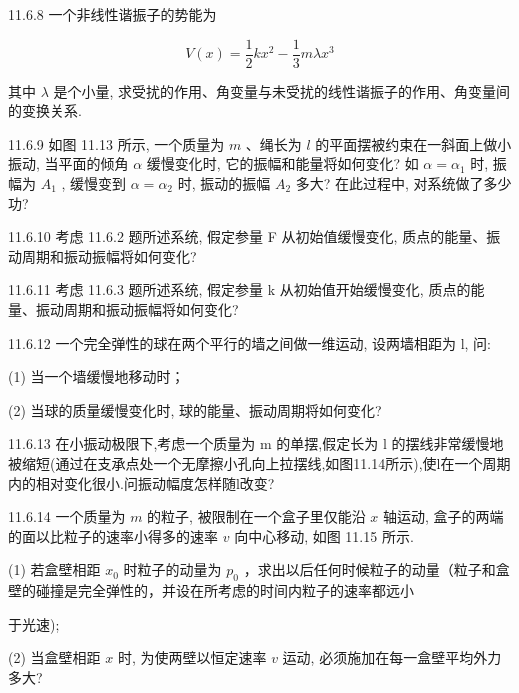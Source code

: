 \begin{problem}{11.6.8}
一个非线性谐振子的势能为

\[
V (x) = \frac {1}{2} k x ^ {2} - \frac {1}{3} m \lambda x ^ {3}
\]

其中 $\lambda$ 是个小量, 求受扰的作用、角变量与未受扰的线性谐振子的作用、角变量间的变换关系.
\end{problem}
\clearpage


\begin{problem}{11.6.9}
如图 11.13 所示, 一个质量为 $m$ 、绳长为 $l$ 的平面摆被约束在一斜面上做小振动, 当平面的倾角 $\alpha$ 缓慢变化时, 它的振幅和能量将如何变化? 如 $\alpha = \alpha_{1}$ 时, 振幅为 $A_{1}$ , 缓慢变到 $\alpha = \alpha_{2}$ 时, 振动的振幅 $A_{2}$ 多大? 在此过程中, 对系统做了多少功?
\begin{center}

\end{center}
\end{problem}
\clearpage


\begin{problem}{11.6.10}
考虑 11.6.2 题所述系统, 假定参量 F 从初始值缓慢变化, 质点的能量、振动周期和振动振幅将如何变化?
\end{problem}
\clearpage


\begin{problem}{11.6.11}
考虑 11.6.3 题所述系统, 假定参量 k 从初始值开始缓慢变化, 质点的能量、振动周期和振动振幅将如何变化?
\end{problem}
\clearpage


\begin{problem}{11.6.12}
一个完全弹性的球在两个平行的墙之间做一维运动, 设两墙相距为 l, 问:

(1) 当一个墙缓慢地移动时；

(2) 当球的质量缓慢变化时, 球的能量、振动周期将如何变化?
\end{problem}
\clearpage


\begin{problem}{11.6.13}
在小振动极限下,考虑一个质量为 m 的单摆,假定长为 l 的摆线非常缓慢地被缩短(通过在支承点处一个无摩擦小孔向上拉摆线,如图11.14所示),使l在一个周期内的相对变化很小.问振动幅度怎样随l改变?
\begin{center}

\end{center}
\end{problem}
\clearpage


\begin{problem}{11.6.14}
一个质量为 $m$ 的粒子, 被限制在一个盒子里仅能沿 $x$ 轴运动, 盒子的两端的面以比粒子的速率小得多的速率 $v$ 向中心移动, 如图 11.15 所示.

(1) 若盒壁相距 $x_{0}$ 时粒子的动量为 $p_{0}$ ，求出以后任何时候粒子的动量（粒子和盒壁的碰撞是完全弹性的，并设在所考虑的时间内粒子的速率都远小

于光速);

(2) 当盒壁相距 $x$ 时, 为使两壁以恒定速率 $v$ 运动, 必须施加在每一盒壁平均外力多大?
\begin{center}

\end{center}
\end{problem}
\clearpage


